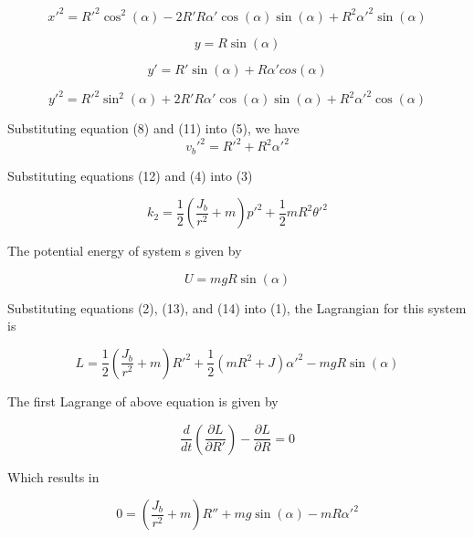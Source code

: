 \documentclass{article}
\begin{document}
\begin{equation} \label{eq:1}
x'^2 = R'^2 \cos^2(\alpha) - 2R'R\alpha' \cos(\alpha) \sin(\alpha) + R^2 \alpha'^2 \sin(\alpha)
\end{equation}

\begin{equation} \label{eq:1}
y= R\sin(\alpha)
\end{equation}

\begin{equation} \label{eq:1}
y' = R'\sin(\alpha)+R\alpha'cos(\alpha)
\end{equation}

\begin{equation} \label{eq:1}
y'^2 = R'^2 \sin^2(\alpha) + 2R'R\alpha' \cos(\alpha) \sin(\alpha) + R^2 \alpha'^2 \cos(\alpha)
\end{equation}

Substituting equation (8) and (11) into (5), we have
\begin{equation} \label{eq:1}
v_b'^2= R'^2 + R^2 \alpha'^2
\end{equation}

Substituting equations (12) and (4) into (3)

\begin{equation} \label{eq:1}
k_2 = \frac{1}{2} (\frac{J_b}{r^2} + m) p'^2 + \frac{1}{2}m R^2 \theta'^2
\end{equation}

The potential energy of system s given by

\begin{equation} \label{eq:1}
U = m g R \sin(\alpha)
\end{equation}

Substituting equations (2), (13), and (14) into (1), the Lagrangian for this system is

\begin{equation} \label{eq:1}
L = \frac{1}{2} (\frac{J_b}{r^2} + m) R'^2 + \frac{1}{2}(m R^2 + J) \alpha'^2 - mgR\sin(\alpha)
\end{equation}

The first Lagrange of above equation is given by

\begin{equation} \label{eq:1}
\frac{d}{dt} (\frac{\partial L}{\partial R'}) - \frac{\partial L} {\partial R} = 0
\end{equation}

Which results in

\begin{equation} \label{eq:1}
0 =  (\frac{J_b}{r^2} + m) R'' + mg\sin(\alpha) - mR\alpha'^2
\end{equation}
\end{document}
